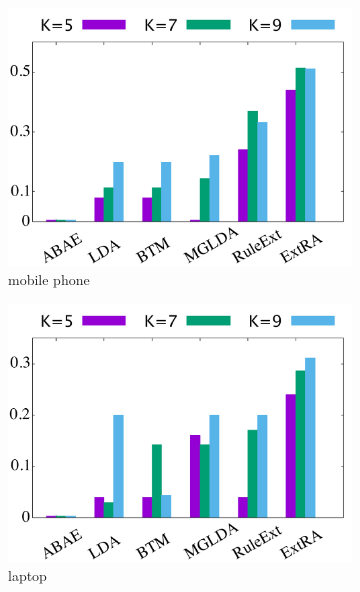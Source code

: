 \begin{figure}[!ht]
	\begin{subfigure}{.333\textwidth}
		\centering
		\includegraphics[width=0.99\linewidth]{figures/mobilephone_h}
		\caption{mobile phone}
		\label{fig:mobilephone_h}
	\end{subfigure}%
	\begin{subfigure}{.333\textwidth}
		\centering
		\includegraphics[width=0.99\linewidth]{figures/laptop_h}
		\caption{laptop}
		\label{fig:laptop_h}
	\end{subfigure}%
	\begin{subfigure}{.333\textwidth}
		\centering

\end{subfigure}
\end{figure}
